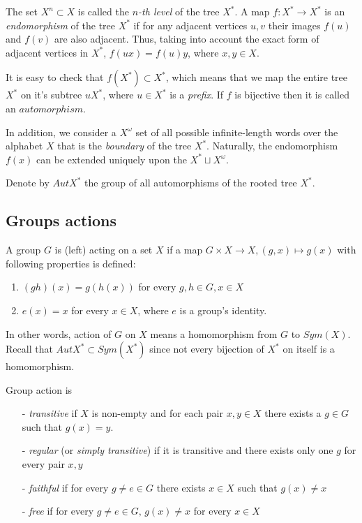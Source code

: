 \documentclass[a4paper,12pt]{amsart}
\begin{document}
	The set $X^n \subset X$ is called the \textit{$n$-th level} of the tree $X^*$. A map $f:X^* \rightarrow X^*$ is an \textit{endomorphism} of the tree $X^*$ if for any adjacent vertices $u, v$ their images $f(u)$ and $f(v)$ are also adjacent. Thus, taking into account the exact form of adjacent vertices in $X^*$, $f(ux) = f(u)y$, where $x, y \in X$.
	
	It is easy to check that $f(X^*) \subset X^*$, which means that we map the entire tree $X^*$ on it's subtree $uX^*$, where $u \in X^*$ is a \textit{prefix}. If $f$ is bijective then it is called an $automorphism$.
	
	In addition, we consider a $X^\omega$ set of all possible infinite-length words over the alphabet $X$ that is the \textit{boundary} of the tree $X^*$. Naturally, the endomorphism $f(x)$ can be extended uniquely upon the $X^* \sqcup X^\omega$.
	
	Denote by $AutX^*$ the group of all automorphisms of the rooted tree $X^*$.
	
	\subsection{Groups actions}
	A group $G$ is (left) acting on a set $X$ if a map $G \times X \rightarrow X, (g, x) \mapsto g(x)$ with following properties is defined: 
	
	\begin{enumerate}
		\item $(gh)(x) = g(h(x))$ for every $g, h \in G, x \in X$
		\item $e(x) = x$ for every $x \in X$, where $e$ is a group's identity.
		 
	\end{enumerate}
		
	In other words, action of $G$ on $X$ means a homomorphism from $G$ to $Sym(X)$. Recall that $AutX^* \subset Sym(X^*)$ since not every bijection of $X^*$ on itself is a homomorphism.
	
	Group action is
	
	\begin{itemize}
		\item[-] \textit{transitive} if $X$ is non-empty and for each pair $x,y \in X$ there exists a $g \in G$ such that $g(x) = y$.
		\item[-] \textit{regular} (or \textit{simply transitive}) if it is transitive and there exists only one $g$ for every pair $x, y$ 
		\item[-] \textit{faithful} if for every $g \neq e \in G$ there exists $x \in X$ such that $g(x) \neq x$
		\item[-] \textit{free} if for every $g \neq e \in G, \, g(x) \neq x$ for every $x \in X$ 
	\end{itemize}
	
\end{document}
